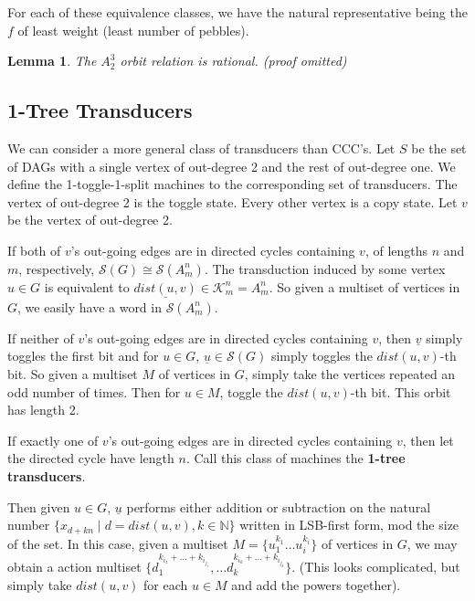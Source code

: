 \documentclass[11pt]{book}
\theoremstyle{pleasant}
\newtheorem{lemma}{Lemma}
\newtheorem{definition}{Definition}
\newcommand{\0}{\underline{0}}
\newcommand{\1}{\underline{1}}
\newcommand{\2}{\underline{2}}
\newcommand{\N}{\mathbb{N}}
\renewcommand{\S}{\mathcal{S}}
\begin{document}
For each of these equivalence classes, we have the natural representative being the $f$ of least weight (least number of pebbles).

\begin{lemma}
The $A^3_2$ orbit relation is rational. (proof omitted)
\end{lemma}



\subsection*{1-Tree Transducers}

We can consider a more general class of transducers than CCC's. Let $S$ be the set of DAGs with a single vertex of out-degree 2 and the rest of out-degree one. We define the 1-toggle-1-split machines to the corresponding set of transducers. The vertex of out-degree 2 is the toggle state. Every other vertex is a copy state. Let $v$ be the vertex of out-degree 2.

If both of $v$'s out-going edges are in directed cycles containing $v$, of lengths $n$ and $m$, respectively, $\S(G) \cong \S(A^n_m)$. The transduction induced by some vertex $u \in G$ is equivalent to $\underline{dist(u, v)} \in \mathcal{K}^n_m = A^n_m$. So given a multiset of vertices in $G$, we easily have a word in $\S(A^n_m)$.

If neither of $v$'s out-going edges are in directed cycles containing $v$, then $\underline{v}$ simply toggles the first bit and for $u \in G$, $\underline{u} \in \S(G)$ simply toggles the $dist(u, v)$-th bit. So given a multiset $M$ of vertices in $G$, simply take the vertices repeated an odd number of times. Then for $u \in M$, toggle the $dist(u, v)$-th bit. This orbit has length 2.

If exactly one of $v$'s out-going edges are in directed cycles containing $v$, then let the directed cycle have length $n$. Call this class of machines the \textbf{1-tree transducers}.

Then given $u \in G$, $\underline{u}$ performs either addition or subtraction on the natural number $\{x_{d+kn} \mid d = dist(u, v), k \in \N \}$ written in LSB-first form, mod the size of the set. In this case, given a multiset $M = \{ u_1^{k_1}\ldots u_i^{k_i} \}$ of vertices in $G$, we may obtain a action multiset $\{ d_1^{k_{i_1} + \ldots + k_{i_{j_1}}}, \ldots d_k^{k_{i_k} + \ldots + k_{i_{j_k}}} \}$. (This looks complicated, but simply take $dist(u, v)$ for each $u \in M$ and add the powers together).
\end{document}
